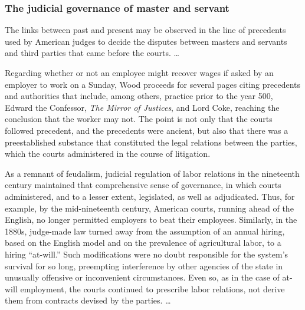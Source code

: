 \documentclass[
  letterpaper,
  11pt,
  DIV=9,
  openright]{scrbook}
\begin{document}

\subsubsection{The judicial governance of master and
servant}\label{the-judicial-governance-of-master-and-servant}

The links between past and present may be observed in the line of
precedents used by American judges to decide the disputes between
masters and servants and third parties that came before the courts.
\ldots{}

Regarding whether or not an employee might recover wages if asked by an
employer to work on a Sunday, Wood proceeds for several pages citing
precedents and authorities that include, among others, practice prior to
the year 500, Edward the Confessor, \emph{The Mirror of Justices}, and
Lord Coke, reaching the conclusion that the worker may not. The point is
not only that the courts followed precedent, and the precedents were
ancient, but also that there was a preestablished substance that
constituted the legal relations between the parties, which the courts
administered in the course of litigation.


As a remnant of feudalism, judicial regulation of labor relations in the
nineteenth century maintained that comprehensive sense of governance, in
which courts administered, and to a lesser extent, legislated, as well
as adjudicated. Thus, for example, by the mid-nineteenth century,
American courts, running ahead of the English, no longer permitted
employers to beat their employees. Similarly, in the 1880s, judge-made
law turned away from the assumption of an annual hiring, based on the
English model and on the prevalence of agricultural labor, to a hiring
``at-will.'' Such modifications were no doubt responsible for the
system's survival for so long, preempting interference by other agencies
of the state in unusually offensive or inconvenient circumstances. Even
so, as in the case of at-will employment, the courts continued to
prescribe labor relations, not derive them from contracts devised by the
parties. \ldots{}
\end{document}

